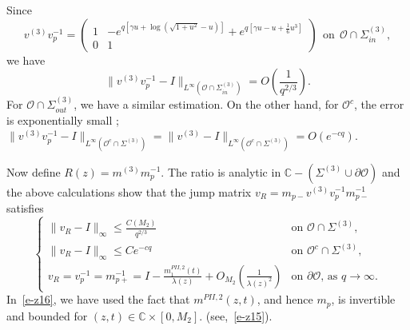 \documentclass{amsart}
\theoremstyle{definition}
\theoremstyle{remark}
\numberwithin{equation}{section}
\newcommand{\C}{\mathbb C}
\begin{document}
Since 
\begin{equation*}
   v^{(3)}v_p^{-1}= 
   \begin{pmatrix} 1& -e^{q[\gamma u+\log(\sqrt{1+u^2}-u)]}+
e^{q[\gamma u-u+\frac16u^3]}\\ 0&1 
   \end{pmatrix} \ \ \text{on} \ \ \mathcal{O}\cap\Sigma_{in}^{(3)},
\end{equation*}
we have $$\|v^{(3)}v_p^{-1}-I\|_{L^{\infty}
(\mathcal{O}\cap\Sigma^{(3)}_{in})}=O(\frac1{q^{2/3}}).$$
For $\mathcal{O}\cap\Sigma_{out}^{(3)}$, we have a similar estimation.
On the other hand, for 
$\mathcal{O}^c$, the error is exponentially small ; 
$\|v^{(3)}v_p^{-1}-I\|_{L^\infty(\mathcal{O}^c\cap\Sigma^{(3)})}
=\|v^{(3)}-I\|_{L^\infty(\mathcal{O}^c\cap\Sigma^{(3)})}=O(e^{-cq})$.

Now define $R(z)=m^{(3)}m_p^{-1}$.
The ratio is analytic in $\C-(\Sigma^{(3)}\cup\partial\mathcal{O})$ 
and the above calculations show that the jump matrix 
$v_R=m_{p-}v^{(3)}v_p^{-1}m_{p-}^{-1}$ satisfies 
\begin{equation}\label{e-z16}
  \begin{cases}
    \|v_R-I\|_\infty\le\frac{C(M_2)}{q^{2/3}}
&\text{on $\mathcal{O} \cap \Sigma^{(3)}$},\\
    \|v_R-I\|_\infty\le Ce^{-cq} 
&\text{on $\mathcal{O}^c \cap \Sigma^{(3)}$},\\
    v_R=v_{p}^{-1}=m_{p+}^{-1}=I-\frac{m^{PII,2}_1(t)}{\lambda(z)}+
O_{M_2}(\frac{1}{\lambda(z)^2}) 
&\text{on $\partial \mathcal{O}$, as $q\to\infty$.}
  \end{cases}
\end{equation}
In~\eqref{e-z16}, we have used the fact that $m^{PII,2}(z,t)$, 
and hence $m_{p}$, is invertible 
and bounded for $(z,t)\in\C\times [0,M_2]$. (see,~\eqref{e-z15}).
\end{document}
